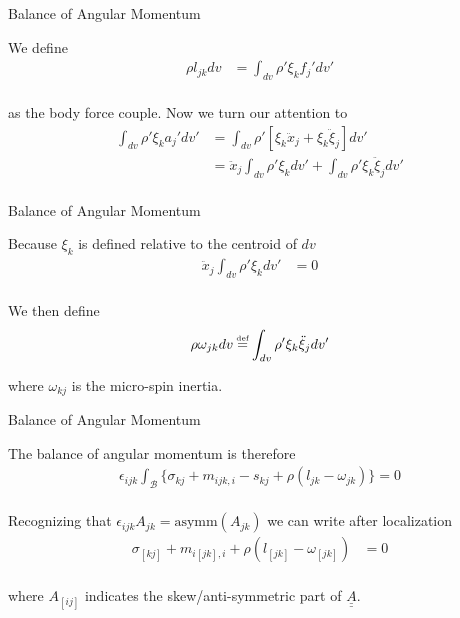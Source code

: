 \documentclass[11pt]{beamer}
\newcommand{\TEN}[1]{\underline{\underline{#1}}}
\newcommand\defeq{\mathrel{\stackrel{\makebox[0pt]{\mbox{\normalfont\tiny def}}}{=}}}
\begin{document}
\begin{frame}{Balance of Angular Momentum}

We define
\begin{align*}
\rho l_{jk} dv &= \int_{dv} \rho' \xi_k f_j' dv'\\
\end{align*}

as the body force couple. Now we turn our attention to
\begin{align*}
\int_{dv} \rho' \xi_k a_j' dv' &= \int_{dv}\rho' \left[\xi_k \ddot{x}_j + \xi_k \ddot{\xi}_j\right] dv'\\
&= \ddot{x}_j \int_{dv} \rho' \xi_k dv' + \int_{dv} \rho' \xi_k \ddot{\xi}_j dv'\\
\end{align*}

\end{frame}

\begin{frame}{Balance of Angular Momentum}

Because $\xi_k$ is defined relative to the centroid of $dv$
\begin{align*}
\ddot{x}_j \int_{dv} \rho' \xi_k dv' &= 0\\
\end{align*}

We then define
\begin{align*}
\rho \omega_{jk} dv &\defeq \int_{dv} \rho' \xi_k \ddot{\xi}_j dv'\\
\end{align*}

where $\omega_{kj}$ is the micro-spin inertia.

\end{frame}

\begin{frame}{Balance of Angular Momentum}

The balance of angular momentum is therefore
\begin{align*}
\epsilon_{ijk}\int_{\mathcal{B}} \bigg\{\sigma_{kj} + m_{ijk,i} - s_{kj} + \rho \left(l_{jk} - \omega_{jk}\right)\bigg\} = 0\\
\end{align*}

Recognizing that $\epsilon_{ijk} A_{jk} = \text{asymm}\left(A_{jk}\right)$ we can write after localization
\begin{align*}
\sigma_{[kj]} + m_{i[jk],i} + \rho\left(l_{[jk]} - \omega_{[jk]}\right) &= 0\\
\end{align*}

where $A_{[ij]}$ indicates the skew/anti-symmetric part of $\TEN{A}$.

\end{frame}
\end{document}
